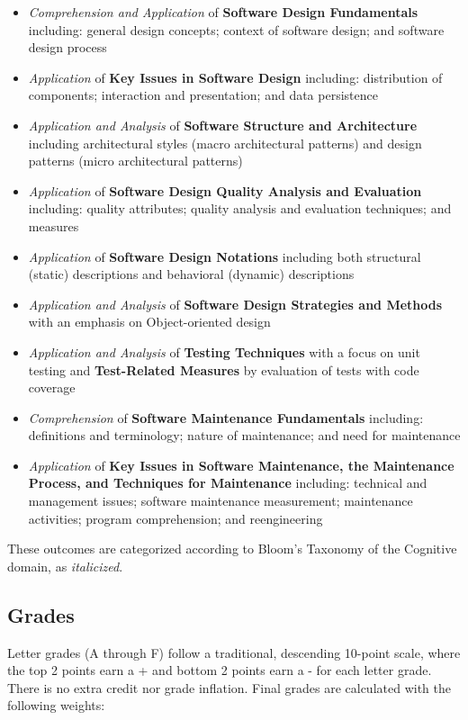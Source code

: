 \documentclass[12pt]{article}
\begin{document}
  \begin{itemize}
    \item \textit{Comprehension and Application} of \textbf{Software Design Fundamentals} including: general design concepts; context of software design; and software design process
    \item \textit{Application} of \textbf{Key Issues in Software Design} including: distribution of components; interaction and presentation; and data persistence
    \item \textit{Application and Analysis} of \textbf{Software Structure and Architecture} including architectural styles (macro architectural patterns) and design patterns (micro architectural patterns) 
    \item \textit{Application} of \textbf{Software Design Quality Analysis and Evaluation} including: quality attributes; quality analysis and evaluation techniques; and measures
    \item \textit{Application} of \textbf{Software Design Notations} including both structural (static) descriptions and behavioral (dynamic) descriptions
    \item \textit{Application and Analysis} of \textbf{Software Design Strategies and Methods} with an emphasis on Object-oriented design
    \item \textit{Application and Analysis} of \textbf{Testing Techniques} with a focus on unit testing and \textbf{Test-Related Measures} by evaluation of tests with code coverage
    \item \textit{Comprehension} of \textbf{Software Maintenance Fundamentals} including: definitions and terminology; nature of maintenance; and need for maintenance
    \item \textit{Application} of \textbf{Key Issues in Software Maintenance, the Maintenance Process, and Techniques for Maintenance} including: technical and management issues; software maintenance measurement; maintenance activities; program comprehension; and reengineering 
  \end{itemize}

  \noindent 
  These outcomes are categorized according to Bloom's Taxonomy of the Cognitive domain, as \textit{italicized}.

  \newpage
  \subsection*{Grades}

  Letter grades (A through F) follow a traditional, descending 10-point scale, where the top 2 points earn a + and bottom 2 points earn a - for each letter grade. There is no extra credit nor grade inflation. Final grades are calculated with the following weights:
\end{document}
